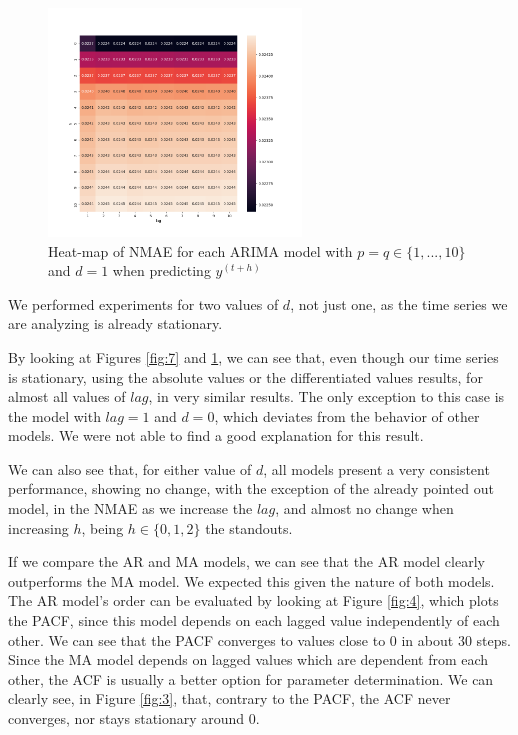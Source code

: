 \documentclass[10pt]{article}
\begin{document}
\begin{figure}[!ht]
    \centering
    \includegraphics[width=0.6\textwidth,height=\textheight,keepaspectratio]{../arima_d_1_nmae_heatmap.png}
    \caption{Heat-map of \textsc{NMAE} for each ARIMA model with $p=q\in\{1,...,10\}$ and $d=1$ when predicting $y^{(t+h)}$}
    \label{fig:8}
\end{figure}

\pagebreak

We performed experiments for two values of $d$, not just one, as the time series we are analyzing is already stationary.

By looking at Figures \ref{fig:7} and \ref{fig:8}, we can see that, even though our time series is stationary, using the absolute values or the differentiated values results, for almost all values of $lag$, in very similar results. The only exception to this case is the model with $lag=1$ and $d=0$, which deviates from the behavior of other models. We were not able to find a good explanation for this result.

We can also see that, for either value of $d$, all models present a very consistent performance, showing no change, with the exception of the already pointed out model, in the \textsc{NMAE} as we increase the $lag$, and almost no change when increasing $h$, being $h\in\{0,1,2\}$ the standouts.

If we compare the AR and MA models, we can see that the AR model clearly outperforms the MA model. We expected this given the nature of both models. The AR model's order can be evaluated by looking at Figure \ref{fig:4}, which plots the PACF, since this model depends on each lagged value independently of each other. We can see that the PACF converges to values close to $0$ in about $30$ steps. Since the MA model depends on lagged values which are dependent from each other, the ACF is usually a better option for parameter determination. We can clearly see, in Figure \ref{fig:3}, that, contrary to the PACF, the ACF never converges, nor stays stationary around $0$.
\end{document}
